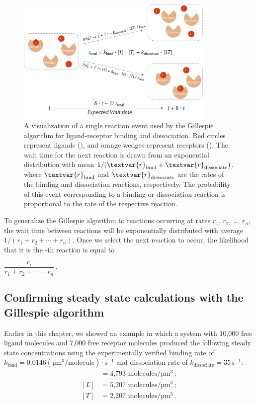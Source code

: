 \begin{figure}[h]
\centering
\mySfFamily
\includegraphics[width = 0.85\textwidth]{../images/chemotaxis_visualizessa.png}
\caption{A visualization of a single reaction event used by the Gillespie algorithm for ligand-receptor binding and dissociation. Red circles represent ligands (), and orange wedges represent receptors (). The wait time for the next reaction is drawn from an exponential distribution with mean $\text{1}/(\textvar{r}_\text{bind} + \textvar{r}_\text{dissociate})$, where $\textvar{r}_\text{bind}$ and $\textvar{r}_\text{dissociate}$ are the rates of the binding and dissociation reactions, respectively. The probability of this event corresponding to a binding or dissociation reaction is proportional to the rate of the respective reaction.}
\label{fig:chemotaxis_visualizessa}
\end{figure}

To generalize the Gillespie algorithm to  reactions occurring at rates $r_1$, $r_2$, \ldots, $r_n$, the wait time between reactions will be exponentially distributed with average $1 / (r_1 + r_2 + \cdots + r_n)$. Once we select the next reaction to occur, the likelihood that it is the -th reaction is equal to

\begin{center}
$\dfrac{r_i}{r_1 + r_2 + \cdots + r_n}$\,.
\end{center}


\FloatBarrier
{}
\subsection{Confirming steady state calculations with the Gillespie algorithm}

Earlier in this chapter, we showed an example in which a system with 10,000 free ligand molecules and 7,000 free receptor molecules produced the following steady state concentrations using the experimentally verified binding rate of $k_\text{bind} = 0.0146 (\text{µm}^3/\text{molecule}) \cdot \text{s}^{-1}$ and dissociation rate of $k_\text{dissociate} = 35\,\text{s}^{-1}$:
\begin{align*}
[LT] & = \text{4,793 molecules}/\text{µm}^3\,;\\
[L] & = \text{5,207 molecules}/\text{µm}^3\,;\\
[T] & = \text{2,207 molecules}/\text{µm}^3\,.
\end{align*}

